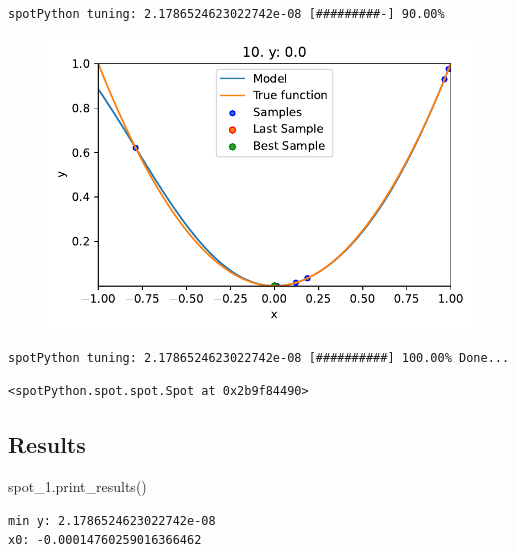 \documentclass[
  letterpaper,
  DIV=11,
  numbers=noendperiod]{scrreprt}
\newenvironment{Shaded}{\begin{snugshade}}{\end{snugshade}}
\newcommand{\NormalTok}[1]{\textcolor[rgb]{0.00,0.23,0.31}{#1}}
\begin{document}
\begin{verbatim}
spotPython tuning: 2.1786524623022742e-08 [#########-] 90.00% 
\end{verbatim}

\begin{figure}[H]

{\centering \includegraphics{010_num_spot_sklearn_surrogate_files/figure-pdf/cell-21-output-14.pdf}

}

\end{figure}

\begin{verbatim}
spotPython tuning: 2.1786524623022742e-08 [##########] 100.00% Done...
\end{verbatim}

\begin{verbatim}
<spotPython.spot.spot.Spot at 0x2b9f84490>
\end{verbatim}

\hypertarget{results-2}{%
\subsection{Results}\label{results-2}}

\begin{Shaded}
\begin{Highlighting}[]
\NormalTok{spot\_1.print\_results()}
\end{Highlighting}
\end{Shaded}

\begin{verbatim}
min y: 2.1786524623022742e-08
x0: -0.00014760259016366462
\end{verbatim}
\end{document}
